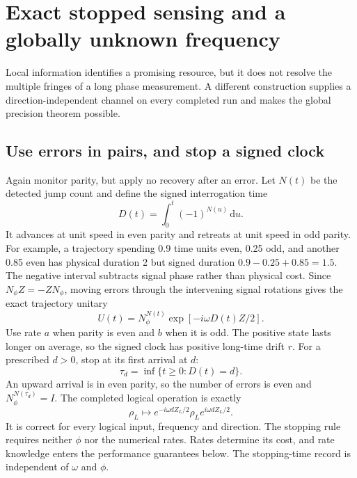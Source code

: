 \documentclass[11pt,a4paper]{article}
\numberwithin{equation}{section}
\theoremstyle{remark}
\begin{document}
\section{Exact stopped sensing and a globally unknown frequency}
\label{markov:global}

Local information identifies a promising resource, but it does not resolve
the multiple fringes of a long phase measurement. A different construction
supplies a direction-independent channel on every completed run and makes
the global precision theorem possible.

\subsection{Use errors in pairs, and stop a signed clock}

Again monitor parity, but apply no recovery after an error. Let $N(t)$ be the
detected jump count and define the signed interrogation time
\begin{equation}
 D(t)=\int_0^t(-1)^{N(u)}\,\mathrm du.
 \label{markov:signed}
\end{equation}
It advances at unit speed in even parity and retreats at unit speed in odd
parity. For example, a trajectory spending 0.9 time units even, 0.25 odd,
and another 0.85 even has physical duration 2 but signed duration
$0.9-0.25+0.85=1.5$. The negative interval subtracts signal phase rather
than physical cost. Since $N_\phi Z=-ZN_\phi$, moving errors through the intervening
signal rotations gives the exact trajectory unitary
\begin{equation}
 U(t)=N_\phi^{N(t)}\exp[-i\omega D(t)Z/2].
 \label{markov:trajectory}
\end{equation}
Use rate $a$ when parity is even and $b$ when it is odd. The positive state
lasts longer on average, so the signed clock has positive long-time drift $r$.
For a prescribed $d>0$, stop at its first arrival at $d$:
\begin{equation}
 \tau_d=\inf\{t\ge0:D(t)=d\}.
\end{equation}
An upward arrival is in even parity, so the number of errors is even and
$N_\phi^{N(\tau_d)}=I$. The completed logical operation is exactly
\begin{equation}
 \rho_L\longmapsto e^{-i\omega dZ_L/2}\rho_L e^{i\omega dZ_L/2}.
 \label{markov:stoppedchannel}
\end{equation}
It is correct for every logical input, frequency and direction. The stopping
rule requires neither $\phi$ nor the numerical rates. Rates determine its
cost, and rate knowledge enters the performance guarantees below. The
stopping-time record is independent of $\omega$ and $\phi$.
\end{document}

